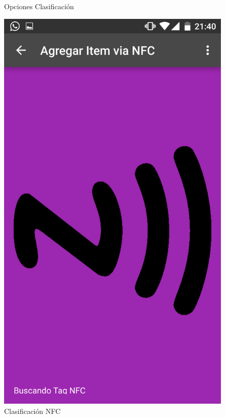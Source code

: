 \documentclass[a4paper,11pt]{book}
\begin{document}
\begin{figure}[H]
  \caption{Opciones Clasificación\cite{propio}}
\endminipage\hfill
{}
  \includegraphics[width=\linewidth]{imagenes/pruebas/movil/movil17.png}
  \caption{Clasificación NFC\cite{propio}}
\endminipage\hfill
\end{figure}
\end{document}
